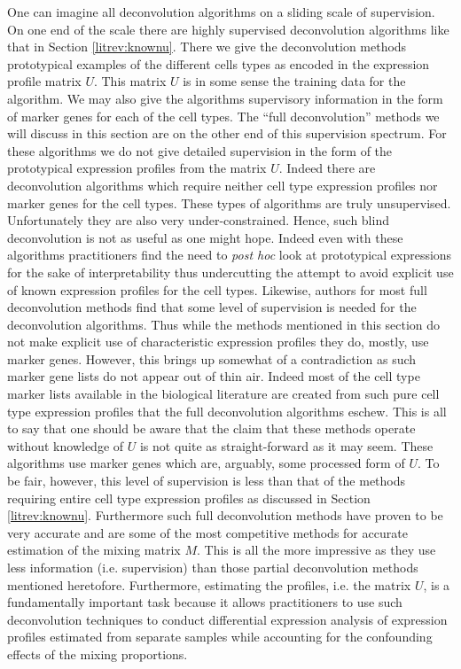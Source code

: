 \documentclass[reqno,12pt,oneside]{report}\usepackage[]{graphicx}\usepackage[]{color}
\theoremstyle{plain}
\theoremstyle{definition}
\theoremstyle{remark}
\numberwithin{theorem}{chapter}     %
\begin{document}
One can imagine all deconvolution algorithms on a sliding scale of supervision. On one end of the scale there are highly supervised deconvolution algorithms like that in Section \ref{litrev:knownu}. There we give the deconvolution methods prototypical examples of the different cells types as encoded in the expression profile matrix $U$. This matrix $U$ is in some sense the training data for the algorithm. We may also give the algorithms supervisory information in the form of marker genes for each of the cell types. The ``full deconvolution'' methods we will discuss in this section are on the other end of this supervision spectrum. For these algorithms we do not give detailed supervision in the form of the prototypical expression profiles from the matrix $U$. Indeed there are deconvolution algorithms which require neither cell type expression profiles nor marker genes for the cell types. These types of algorithms are truly unsupervised. Unfortunately they are also very under-constrained. Hence, such blind deconvolution is not as useful as one might hope. Indeed even with these algorithms practitioners find the need to \emph{post hoc} look at prototypical expressions for the sake of interpretability thus undercutting the attempt to avoid explicit use of known expression profiles for the cell types. Likewise, authors for most full deconvolution methods find that some level of supervision is needed for the deconvolution algorithms. Thus while the methods mentioned in this section do not make explicit use of characteristic expression profiles they do, mostly, use marker genes. However, this brings up somewhat of a contradiction as such marker gene lists do not appear out of thin air. Indeed most of the cell type marker lists available in the biological literature are created from such pure cell type expression profiles that the full deconvolution algorithms eschew. This is all to say that one should be aware that the claim that these methods operate without knowledge of $U$ is not quite as straight-forward as it may seem. These algorithms use marker genes which are, arguably, some processed form of $U$. To be fair, however, this level of supervision is less than that of the methods requiring entire cell type expression profiles as discussed in Section \ref{litrev:knownu}. Furthermore such full deconvolution methods have proven to be very accurate and are some of the most competitive methods for accurate estimation of the mixing matrix $M$. This is all the more impressive as they use less information (i.e. supervision) than those partial deconvolution methods mentioned heretofore. Furthermore, estimating the profiles, i.e. the matrix $U$, is a fundamentally important task because it allows practitioners to use such deconvolution techniques to conduct differential expression analysis of expression profiles estimated from separate samples while accounting for the confounding effects of the mixing proportions. 
\end{document}
